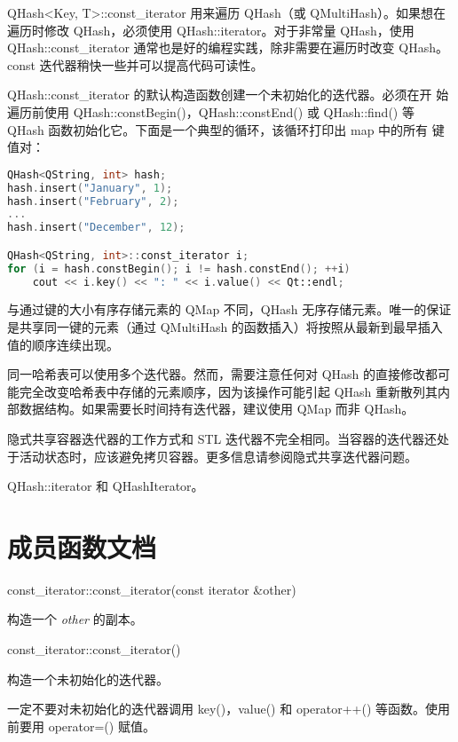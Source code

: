 QHash<Key, T>::const\_iterator 用来遍历 QHash（或 QMultiHash）。如果想在遍历时修改 QHash，必须使用 QHash::iterator。对于非常量 QHash，使用 QHash::const\_iterator 通常也是好的编程实践，除非需要在遍历时改变 QHash。const 迭代器稍快一些并可以提高代码可读性。

QHash::const\_iterator 的默认构造函数创建一个未初始化的迭代器。必须在开
始遍历前使用 QHash::constBegin()，QHash::constEnd() 或 QHash::find()
等 QHash 函数初始化它。下面是一个典型的循环，该循环打印出 map 中的所有
键值对：

\begin{lstlisting}[language=C++]
QHash<QString, int> hash;
hash.insert("January", 1);
hash.insert("February", 2);
...
hash.insert("December", 12);

QHash<QString, int>::const_iterator i;
for (i = hash.constBegin(); i != hash.constEnd(); ++i)
    cout << i.key() << ": " << i.value() << Qt::endl;
\end{lstlisting}

与通过键的大小有序存储元素的 QMap 不同，QHash 无序存储元素。唯一的保证是共享同一键的元素（通过 QMultiHash 的函数插入）将按照从最新到最早插入值的顺序连续出现。

同一哈希表可以使用多个迭代器。然而，需要注意任何对 QHash 的直接修改都可能完全改变哈希表中存储的元素顺序，因为该操作可能引起 QHash 重新散列其内部数据结构。如果需要长时间持有迭代器，建议使用 QMap 而非 QHash。

\begin{notice}
	隐式共享容器迭代器的工作方式和 STL 迭代器不完全相同。当容器的迭代器还处于活动状态时，应该避免拷贝容器。更多信息请参阅隐式共享迭代器问题。
\end{notice}



\begin{seeAlso}
 QHash::iterator 和 QHashIterator。
\end{seeAlso}

\splitLine

\section{成员函数文档}

const\_iterator::const\_iterator(const iterator \&other)

构造一个 \emph{other} 的副本。

const\_iterator::const\_iterator()

构造一个未初始化的迭代器。

一定不要对未初始化的迭代器调用 key()，value() 和 operator++() 等函数。使用前要用 operator=() 赋值。

